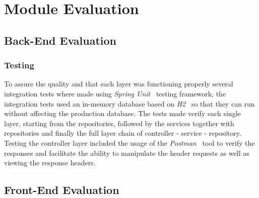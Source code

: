 % 
%
\chapter{Module Evaluation}

\section{Back-End Evaluation}

\subsection{Testing}

To assure the quality and that each layer was functioning properly several integration tests where made using \textit{Spring Unit}~\cite{spring-testing-unit} testing framework, the integration tests used an in-memory database based on \textit{H2}~\cite{h2-db} so that they can run without affecting the production database. The tests made verify each single layer, starting from the repositories, followed by the services together with repositories and finally the full layer chain of controller - service - repository. Testing the controller layer included the usage of the \textit{Postman}~\cite{postman} tool to verify the responses and facilitate the ability to manipulate the header requests as well as viewing the response headers.

\section{Front-End Evaluation}
